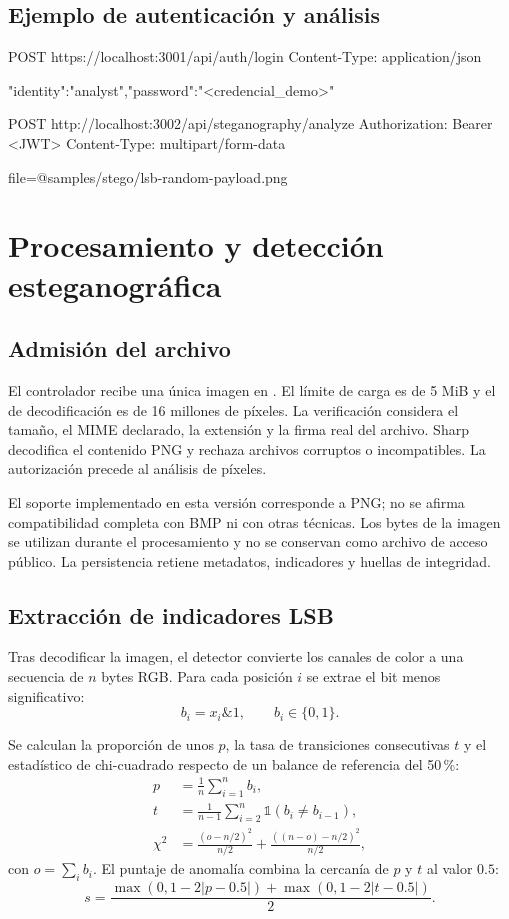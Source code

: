 \documentclass[11pt,a4paper,oneside]{article}
\newcommand{\code}[1]{{\footnotesize\texttt{\detokenize{#1}}}}
\begin{document}
\subsection{Ejemplo de autenticación y análisis}
\begin{codetext}
POST https://localhost:3001/api/auth/login
Content-Type: application/json

{"identity":"analyst","password":"<credencial_demo>"}

POST http://localhost:3002/api/steganography/analyze
Authorization: Bearer <JWT>
Content-Type: multipart/form-data

file=@samples/stego/lsb-random-payload.png
\end{codetext}

\section{Procesamiento y detección esteganográfica}
\subsection{Admisión del archivo}
El controlador recibe una única imagen en \code{multipart/form-data}. El límite de carga es de 5 MiB y el de decodificación es de 16 millones de píxeles. La verificación considera el tamaño, el MIME declarado, la extensión y la firma real del archivo. Sharp decodifica el contenido PNG y rechaza archivos corruptos o incompatibles. La autorización precede al análisis de píxeles.

El soporte implementado en esta versión corresponde a PNG; no se afirma compatibilidad completa con BMP ni con otras técnicas. Los bytes de la imagen se utilizan durante el procesamiento y no se conservan como archivo de acceso público. La persistencia retiene metadatos, indicadores y huellas de integridad.

\subsection{Extracción de indicadores LSB}
Tras decodificar la imagen, el detector convierte los canales de color a una secuencia de $n$ bytes RGB. Para cada posición $i$ se extrae el bit menos significativo:
\begin{equation}
  b_i=x_i\mathbin{\&}1,\qquad b_i\in\{0,1\}.
\end{equation}

Se calculan la proporción de unos $p$, la tasa de transiciones consecutivas $t$ y el estadístico de chi-cuadrado respecto de un balance de referencia del 50\,\%:
\begin{align}
  p &= \frac{1}{n}\sum_{i=1}^{n}b_i,\\
  t &= \frac{1}{n-1}\sum_{i=2}^{n}\mathbb{1}(b_i\neq b_{i-1}),\\
  \chi^2 &=\frac{(o-n/2)^2}{n/2}+\frac{((n-o)-n/2)^2}{n/2},
\end{align}
con $o=\sum_i b_i$. El puntaje de anomalía combina la cercanía de $p$ y $t$ al valor $0.5$:
\begin{equation}
  s = \frac{\max(0,1-2|p-0.5|)+\max(0,1-2|t-0.5|)}{2}.
\end{equation}
\end{document}
